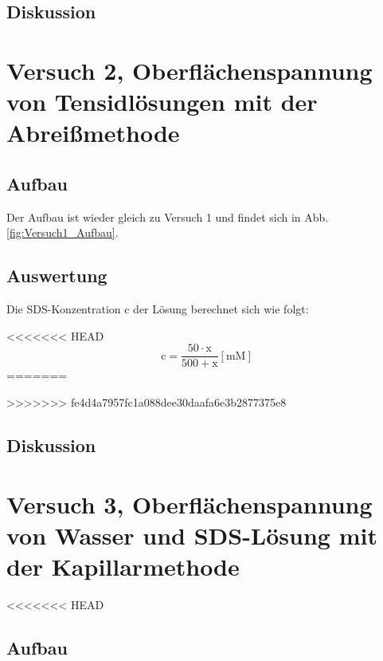         \subsection{Diskussion}

    \section{Versuch 2, Oberflächenspannung von Tensidlösungen mit der Abreißmethode}

        \subsection{Aufbau}
            Der Aufbau ist wieder gleich zu Versuch 1 und findet sich in Abb. \ref{fig:Versuch1_Aufbau}. 

        \subsection{Auswertung}
            Die SDS-Konzentration $\mathrm{c}$ der Lösung berechnet sich wie folgt:

<<<<<<< HEAD
        \begin{equation}
            \mathrm{c} = \frac{50 \cdot \mathrm{x}}{500  + \mathrm{x} }\mathrm{[mM]}
            \label{eq:Konzentration}
        \end{equation}
=======
        
>>>>>>> fe4d4a7957fc1a088dee30daafa6e3b2877375e8
        \subsection{Diskussion}

    \section{Versuch 3, Oberflächenspannung von Wasser und SDS-Lösung mit der Kapillarmethode}

<<<<<<< HEAD
       \subsection{Aufbau}
        
